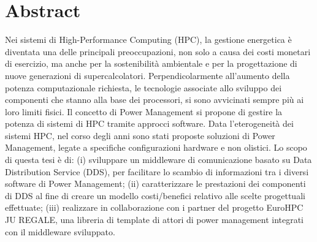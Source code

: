 \section*{Abstract}
\label{TODO}
Nei sistemi di High-Performance Computing (HPC), la gestione energetica è diventata una delle principali preoccupazioni, non solo a causa dei costi monetari di esercizio, ma anche per la sostenibilità ambientale e per la progettazione di nuove generazioni di supercalcolatori\cite{growth}. Perpendicolarmente all'aumento della potenza computazionale richiesta, le tecnologie associate allo sviluppo dei componenti che stanno alla base dei processori, si sono avvicinati sempre più ai loro limiti fisici. Il concetto di Power Management si propone di gestire la potenza di sistemi di HPC tramite approcci software. Data l'eterogeneità dei sistemi HPC, nel corso degli anni sono stati proposte soluzioni di Power Management, legate a specifiche configurazioni hardware e non olistici. %
Lo scopo di questa tesi è di: (i) sviluppare un middleware di comunicazione basato su Data Distribution Service (DDS), per facilitare lo scambio di informazioni tra i diversi software di Power Management; (ii) caratterizzare le prestazioni dei componenti di DDS al fine di creare un modello costi/benefici relativo alle scelte progettuali effettuate; (iii) realizzare in collaborazione con i partner del progetto EuroHPC JU REGALE, una libreria di template di attori di power management integrati con il middleware sviluppato.

